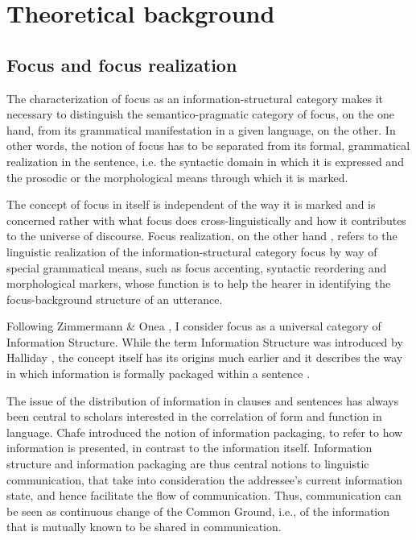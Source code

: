\documentclass[12pt]{report}
\begin{document}
\setcounter{chapter}{0}

\part{Theoretical background}
\newpage

\chapter{Focus and focus realization} \label{focusandfocusrealization} 

The characterization of focus as an information-structural category makes it necessary to distinguish the semantico-pragmatic category of focus, on the one hand, from its grammatical manifestation in a given language, on the other.
In other words, the notion of focus has to be separated from its formal, grammatical realization in the sentence, i.e. the syntactic domain in which it is expressed and the prosodic or the morphological means through which it is marked.


The concept of focus in itself is independent of the way it is marked and is concerned rather with what focus does cross-linguistically and how it contributes to the universe of discourse. Focus realization, on the other hand \cite{Buring:focustypology}, refers to the linguistic realization of the information-structural category focus by way of special grammatical means, such as focus accenting, syntactic reordering and morphological markers, whose function is to help the hearer in identifying the focus-background structure of an utterance.

Following Zimmermann \& Onea \cite{zimmermann2011focus}, I consider focus as a universal category of Information Structure. While the term Information Structure was introduced by Halliday \cite{halliday_1967}, the concept itself has its origins much earlier and it describes the way in which information is formally packaged within a sentence \cite{chafe1976givenness}. 


The issue of the distribution of information in clauses and sentences has always been central to scholars interested in the correlation of form and function in language.
Chafe \cite{chafe1976givenness} introduced the notion of information packaging, to refer to how information is presented, in contrast to the information itself. Information structure and information packaging are thus central notions to linguistic communication, that take into consideration the addressee’s current information state, and hence facilitate the flow of communication. Thus, communication can be seen as continuous change of the Common Ground, i.e., of the information that is mutually known to be shared in communication. 
\end{document}
